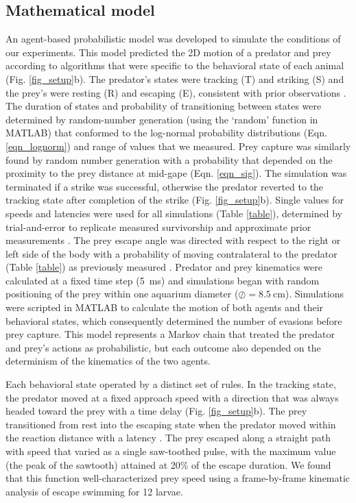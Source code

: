 \documentclass[]{rsos}%
\begin{document}
\subsection{Mathematical model}
An agent-based probabilistic model was developed to simulate the conditions of our experiments. 
This model predicted the 2D motion of a predator and prey \cite{Isaacs:1965uz} according to algorithms that were specific to the behavioral state of each animal (Fig. \ref{fig_setup}b). 
The predator's states were tracking (T) and striking (S) and the prey's were resting (R) and escaping (E), consistent with prior observations \cite{Stewart:2013bha, Stewart:2014cma}. 
The duration of states and probability of transitioning between states were determined by random-number generation (using the `random' function in MATLAB) that conformed to the log-normal probability distributions (Eqn. \ref{eqn_lognorm}) and range of values that we measured.
Prey capture was similarly found by random number generation with a probability that depended on the proximity to the prey distance at mid-gape (Eqn. \ref{eqn_sig}).
The simulation was terminated if a strike was successful, otherwise the predator reverted to the tracking state after completion of the strike (Fig. \ref{fig_setup}b).
Single values for speeds and latencies were used for all simulations (Table \ref{table}), determined by trial-and-error to replicate measured survivorship and approximate prior measurements \cite{McHenry:2005tc, Stewart:2013bha}. 
The prey escape angle was directed with respect to the right or left side of the body with a probability of moving contralateral to the predator (Table \ref{table}) as previously measured \cite{Stewart:2014cma}.
Predator and prey kinematics were calculated at a fixed time step (\SI{5}{\ms}) and simulations began with random positioning of the prey within one aquarium diameter ($\oslash = \SI{8.5}{\cm}$). 
Simulations were scripted in MATLAB to calculate the motion of both agents and their behavioral states, which consequently determined the number of evasions before prey capture.
This model represents a Markov chain that treated the predator and prey's actions as probabilistic, but each outcome also depended on the determinism of the kinematics of the two agents.

Each behavioral state operated by a distinct set of rules.
In the tracking state, the predator moved at a fixed approach speed with a direction that was always headed toward the prey with a time delay (Fig. \ref{fig_setup}b).
The prey transitioned from rest into the escaping state when the predator moved within the reaction distance with a latency \cite{Nair:2015gk}.
The prey escaped along a straight path with speed that varied as a single saw-toothed pulse, with the maximum value (the peak of the sawtooth) attained at 20\% of the escape duration. 
We found that this function well-characterized prey speed using a frame-by-frame kinematic analysis of escape swimming for 12 larvae. 
\end{document}
